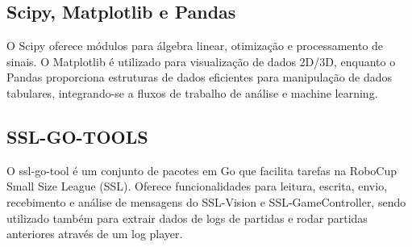 \subsection{Scipy, Matplotlib e Pandas} O Scipy oferece módulos para álgebra linear, otimização e processamento de sinais. O Matplotlib é utilizado para visualização de dados 2D/3D, enquanto o Pandas proporciona estruturas de dados eficientes para manipulação de dados tabulares, integrando-se a fluxos de trabalho de análise e machine learning.

\subsection{SSL-GO-TOOLS} O ssl-go-tool é um conjunto de pacotes em Go que facilita tarefas na RoboCup Small Size League (SSL). Oferece funcionalidades para leitura, escrita, envio, recebimento e análise de mensagens do SSL-Vision e SSL-GameController, sendo utilizado também para extrair dados de logs de partidas e rodar partidas anteriores através de um log player.